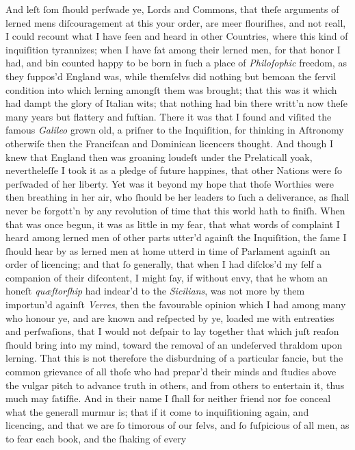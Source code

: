 And leſt ſom ſhould perſwade ye, Lords and Commons, that theſe arguments of
lerned mens diſcouragement at this your order, are meer flouriſhes, and not
reall, I could recount what I have ſeen and heard in other Countries, where this
kind of inquiſition tyrannizes; when I have ſat among their lerned men, for that
honor I had, and bin counted happy to be born in ſuch a place of
\textit{Philoſophic} freedom, as they ſuppos'd England was, while themſelvs did
nothing but bemoan the ſervil condition into which lerning amongſt them was
brought; that this was it which had dampt the glory of Italian wits; that
nothing had bin there writt'n now theſe many years but flattery and fuſtian.
There it was that I found and viſited the famous \textit{Galileo} grown old, a
priſner to the Inquiſition, for thinking in Aſtronomy otherwiſe then the
Franciſcan and Dominican licencers thought.  And though I knew that England then
was groaning loudeſt under the Prelaticall yoak, nevertheleſſe I took it as a
pledge of future happines, that other Nations were ſo perſwaded of her liberty.
Yet was it beyond my hope that thoſe Worthies were then breathing in her air,
who ſhould be her leaders to ſuch a deliverance, as ſhall never be forgott'n by
any revolution of time that this world hath to finiſh.  When that was once
begun, it was as little in my fear, that what words of complaint I heard among
lerned men of other parts utter'd againſt the Inquiſition, the ſame I ſhould
hear by as lerned men at home utterd in time of Parlament againſt an order of
licencing; and that ſo generally, that when I had diſclos'd my ſelf a companion
of their diſcontent, I might ſay, if without envy, that he whom an honeſt
\textit{quæſtorſhip} had indear'd to the \textit{Sicilians}, was not more by
them importun'd againſt \textit{Verres}, then the favourable opinion which I had
among many who honour ye, and are known and reſpected by ye, loaded me with
entreaties and perſwaſions, that I would not deſpair to lay together that which
juſt reaſon ſhould bring into my mind, toward the removal of an undeſerved
thraldom upon lerning.  That this is not therefore the disburdning of a
particular fancie, but the common grievance of all thoſe who had prepar'd their
minds and ſtudies above the vulgar pitch to advance truth in others, and from
others to entertain it, thus much may ſatiſfie.  And in their name I ſhall for
neither friend nor foe conceal what the generall murmur is; that if it come to
inquiſitioning again, and licencing, and that we are ſo timorous of our ſelvs,
and ſo ſuſpicious of all men, as to fear each book, and the ſhaking of every

